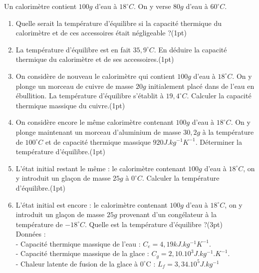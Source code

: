 \documentclass[12pt]{article}
\begin{document}
  Un calorimètre contient $100 g$ d’eau à $18^{\circ}C$. On y verse $80 g$ d’eau à $60^{\circ}C$.
  \begin{enumerate}
    \item Quelle serait la température d'équilibre si la capacité thermique du calorimètre et de ces accessoires était
      négligeable ?\dotfill(1pt)
\item La température d’équilibre est en fait $35,9^{\circ}C$. En déduire la capacité thermique du calorimètre et de ses
accessoires.\dotfill(1pt)

\item On considère de nouveau le calorimètre qui contient $100 g$ d’eau à $18^{\circ}C$. On y plonge un morceau de
cuivre de masse $20 g$ initialement placé dans de l’eau en ébullition. La température d'équilibre s’établit à
$19,4^{\circ}C$. Calculer la capacité thermique massique du cuivre.\dotfill(1pt)

\item  On considère encore le même calorimètre contenant $100 g$ d’eau à $18^{\circ}C$. On y plonge maintenant un
morceau d’aluminium de masse $30,2 g$ à la température de $100^{\circ}C$ et de capacité thermique massique $920J.kg^{-1}K^{-1}$.
Déterminer la température d'équilibre.\dotfill(1pt)

\item  L’état initial restant le même : le calorimètre contenant $100 g$ d’eau à $18^{\circ}C$, on y introduit un glaçon de
masse $25 g$ à $0^{\circ}C$. Calculer la température d'équilibre.\dotfill(1pt)

\item  L’état initial est encore : le calorimètre contenant $100 g$ d’eau à $18^{\circ}C$, on y introduit un glaçon de masse
$25g$ provenant d’un congélateur à la température de $-18^{\circ}C$. Quelle est la température d’équilibre ?\dotfill(3pt)
\\Données :
\\- Capacité thermique massique de l’eau : $C_e = 4,19 kJ.kg^{-1}K^{-1}$.
\\- Capacité thermique massique de la glace : $C_g = 2,10.10^3 J.kg^{-1}.K^{-1}$.
      \\- Chaleur latente de fusion de la glace à $0^{\circ}$C : $L_f = 3,34.10^5 J.kg^{-1}$
      \end{enumerate}
\end{document}
